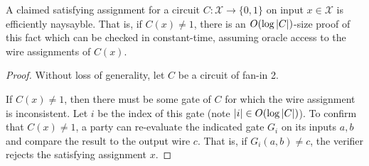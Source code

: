 \begin{lemma}\label{lemma:naysayingCSAT}
    A claimed satisfying assignment for a circuit $C: \mathcal{X} \to \{0,1\}$ on input $x \in \mathcal{X}$ is efficiently naysayble. That is, if $C(x) \neq 1$, there is an $O(\log{\lvert C \rvert})$-size proof of this fact which can be checked in constant-time, assuming oracle access to the wire assignments of $C(x)$.
\end{lemma}
\begin{proof}
    Without loss of generality, let $C$ be a circuit of fan-in 2. 
    
    If $C(x) \neq 1$, then there must be some gate of $C$ for which the wire assignment is inconsistent. Let $i$ be the index of this gate (note $\lvert i \rvert \in O(\log{\lvert C \rvert})$). To confirm that $C(x) \neq 1$, a party can re-evaluate the indicated gate $G_i$ on its inputs $a,b$ and compare the result to the output wire $c$. That is, if $G_i(a,b) \neq c$, the verifier rejects the satisfying assignment $x$.
\end{proof}


